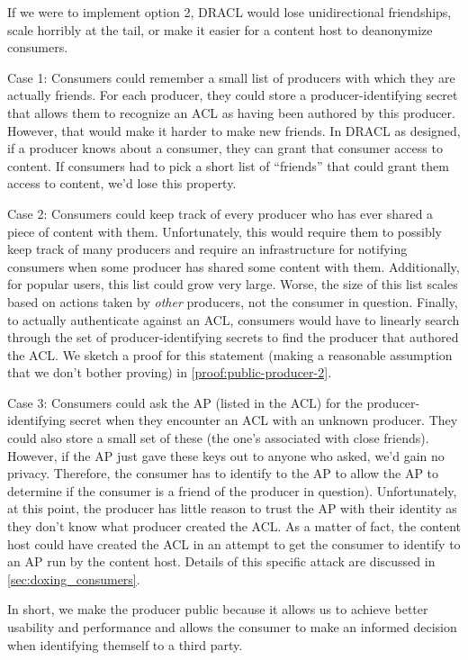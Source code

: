 \documentclass[pdftex,12pt,a4papaer,twoside,notitlepage]{report}
\begin{document}
If we were to implement option 2, DRACL would lose unidirectional friendships,
scale horribly at the tail, or make it easier for a content host to deanonymize
consumers.

Case 1: Consumers could remember a small list of producers with which they are
actually friends. For each producer, they could store a producer-identifying
secret that allows them to recognize an ACL as having been authored by this
producer. However, that would make it harder to make new friends. In DRACL as
designed, if a producer knows about a consumer, they can grant that consumer
access to content. If consumers had to pick a short list of ``friends'' that
could grant them access to content, we'd lose this property.

Case 2: Consumers could keep track of every producer who has ever shared a piece
of content with them. Unfortunately, this would require them to possibly keep
track of many producers and require an infrastructure for notifying consumers
when some producer has shared some content with them. Additionally, for popular
users, this list could grow very large. Worse, the size of this list scales
based on actions taken by \emph{other} producers, not the consumer in question.
Finally, to actually authenticate against an ACL, consumers would have to
linearly search through the set of producer-identifying secrets to find the
producer that authored the ACL\@. We sketch a proof for this statement (making a
reasonable assumption that we don't bother proving) in
\cref{proof:public-producer-2}.

Case 3: Consumers could ask the AP (listed in the ACL) for the
producer-identifying secret when they encounter an ACL with an unknown producer.
They could also store a small set of these (the one's associated with close
friends). However, if the AP just gave these keys out to anyone who asked, we'd
gain no privacy. Therefore, the consumer has to identify to the AP to allow the
AP to determine if the consumer is a friend of the producer in question).
Unfortunately, at this point, the producer has little reason to trust the AP
with their identity as they don't know what producer created the ACL. As a
matter of fact, the content host could have created the ACL in an attempt to get
the consumer to identify to an AP run by the content host. Details of this
specific attack are discussed in \cref{sec:doxing_consumers}.

In short, we make the producer public because it allows us to achieve better
usability and performance and allows the consumer to make an informed decision
when identifying themself to a third party.
\end{document}
